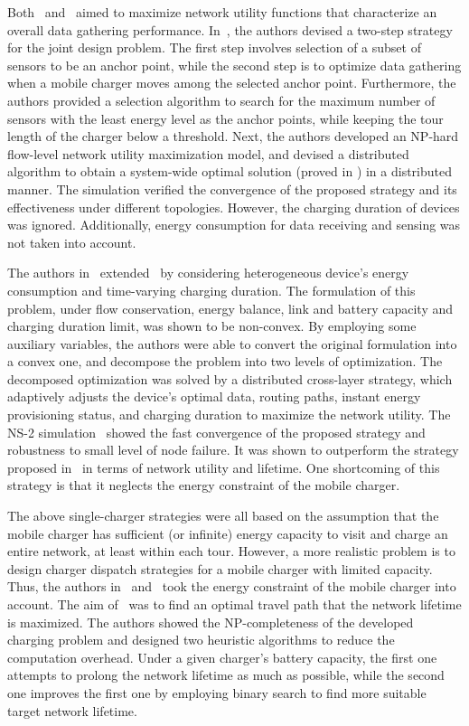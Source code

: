 \documentclass[twocolumn,10pt]{IEEEtran}
\begin{document}
Both~\cite{M2014Zhao} and~\cite{S2014Guo} aimed to maximize network utility functions that characterize an overall data gathering performance. 
In~\cite{M2014Zhao}, the authors devised a two-step strategy for the joint design problem. The first step involves selection of a subset of sensors to be an anchor point, while the second step is to optimize data gathering when a mobile charger moves among the selected anchor point. Furthermore, the authors provided a selection algorithm to search for the maximum number of sensors with the least energy level as the anchor points, while keeping the tour length of the charger below a threshold. Next, the authors developed an NP-hard flow-level network utility maximization model, and devised a distributed algorithm to obtain a system-wide optimal solution (proved in \cite{P.1989Bertsekas}) in a distributed manner.  The simulation verified the convergence of the proposed strategy and its effectiveness under different topologies. However, the charging duration of devices was ignored. Additionally, energy consumption for data receiving and sensing was not taken into account. 

The authors in~\cite{S2014Guo} extended~\cite{M2014Zhao} by considering heterogeneous device's energy consumption and time-varying charging duration. The formulation of this problem, under flow conservation, energy balance, link and battery capacity and charging duration limit, was shown to be non-convex. By employing some auxiliary variables, the authors were able to convert the original formulation into a convex one, and decompose the problem into two levels of optimization. The decomposed optimization was solved by a distributed cross-layer strategy, which adaptively adjusts the device's optimal data, routing paths, instant energy provisioning status, and charging duration to maximize the network utility. The NS-2 simulation~\cite{NS2} showed the fast convergence of the proposed strategy and robustness to small level of node failure. It was shown to outperform the strategy proposed in~\cite{M2014Zhao} in terms of network utility and lifetime. One shortcoming of this strategy is that it neglects the energy constraint of the mobile charger.




The above single-charger strategies were all based on the assumption that the mobile charger has sufficient (or infinite) energy capacity to visit and charge an entire network, at least within each tour. However, a more realistic problem is to design charger dispatch strategies for a mobile charger with limited capacity. Thus, the authors in~\cite{Y2010Peng} and~\cite{K2012Li} took the energy constraint of the mobile charger into account. The aim of~\cite{Y2010Peng} was to find an optimal travel path that the network lifetime is maximized. The authors showed the NP-completeness of the developed charging problem and designed two heuristic algorithms to reduce the computation overhead. Under a given charger's battery capacity, the first one attempts to prolong the network lifetime as much as possible, while the second one improves the first one by employing binary search to find more suitable target network lifetime. 
\end{document}
